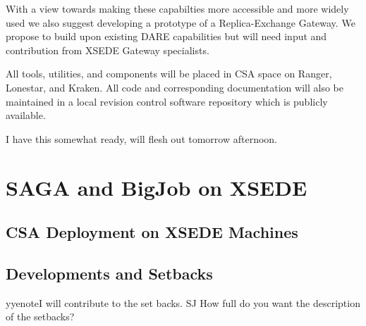 \documentclass{sig-alternate}
\begin{document}
With a view towards making these capabilties more accessible  and more widely
used we also suggest developing a  prototype of a Replica-Exchange Gateway. We
propose to build upon existing DARE capabilities but will need input and
contribution from XSEDE  Gateway specialists.  

All tools, utilities, and components will be placed in CSA space on Ranger,
Lonestar, and Kraken. All code and corresponding documentation will also be
maintained in a local revision control software repository which is publicly
available.




I have this somewhat ready, will flesh out tomorrow
afternoon. 

\section{SAGA and BigJob on XSEDE}

\subsection{CSA Deployment on XSEDE Machines}


\subsection{Developments and Setbacks}


yyenote{I will contribute to the set backs. SJ How full do you want the
description of the setbacks? }
\end{document}
